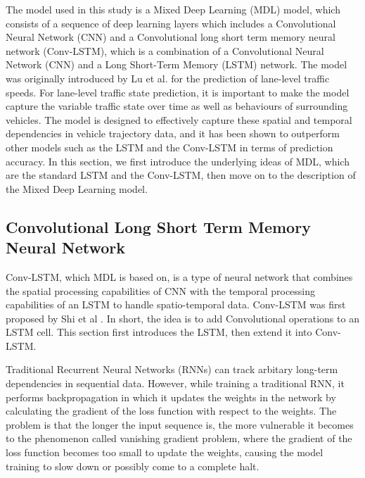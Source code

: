 \documentclass[11pt]{uonthesis}
\begin{document}
The model used in this study is a Mixed Deep Learning (MDL) model, which consists of a sequence of deep learning layers which includes a Convolutional Neural Network (CNN) and a Convolutional long short term memory neural network (Conv-LSTM), which is a combination of a Convolutional Neural Network (CNN) and a Long Short-Term Memory (LSTM) network. The model was originally introduced by Lu et al.\cite{9284587} for the prediction of lane-level traffic speeds. For lane-level traffic state prediction, it is important to make the model capture the variable traffic state over time as well as behaviours of surrounding vehicles. The model is designed to effectively capture these spatial and temporal dependencies in vehicle trajectory data, and it has been shown to outperform other models such as the LSTM and the Conv-LSTM in terms of prediction accuracy. In this section, we first introduce the underlying ideas of MDL, which are the standard LSTM and the Conv-LSTM, then move on to the description of the Mixed Deep Learning model.

\subsection{Convolutional Long Short Term Memory Neural Network}
Conv-LSTM, which MDL is based on, is a type of neural network that combines the spatial processing capabilities of CNN with the temporal processing capabilities of an LSTM to handle spatio-temporal data. Conv-LSTM was first proposed by Shi et al \cite{convlstm}. In short, the idea is to add Convolutional operations to an LSTM cell. This section first introduces the LSTM, then extend it into Conv-LSTM.

Traditional Recurrent Neural Networks (RNNs) can track arbitary long-term dependencies in sequential data. However, while training a traditional RNN, it performs backpropagation in which it updates the weights in the network by calculating the gradient of the loss function with respect to the weights. The problem is that the longer the input sequence is, the more vulnerable it becomes to the phenomenon called vanishing gradient problem, where the gradient of the loss function becomes too small to update the weights, causing the model training to slow down or possibly come to a complete halt. %
\end{document}
